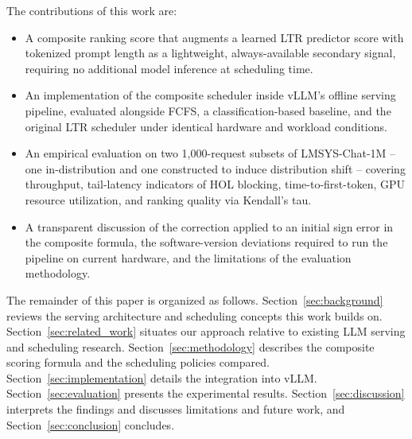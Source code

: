 The contributions of this work are:
\begin{itemize}
    \item A composite ranking score that augments a learned LTR predictor
    score with tokenized prompt length as a lightweight, always-available
    secondary signal, requiring no additional model inference at scheduling
    time.
    \item An implementation of the composite scheduler inside vLLM's offline
    serving pipeline, evaluated alongside FCFS, a classification-based
    baseline, and the original LTR scheduler under identical hardware and
    workload conditions.
    \item An empirical evaluation on two 1{,}000-request subsets of
    LMSYS-Chat-1M -- one in-distribution and one constructed to induce
    distribution shift -- covering throughput, tail-latency indicators of HOL
    blocking, time-to-first-token, GPU resource utilization, and ranking
    quality via Kendall's tau.
    \item A transparent discussion of the correction applied to an initial
    sign error in the composite formula, the software-version deviations
    required to run the pipeline on current hardware, and the limitations of
    the evaluation methodology.
\end{itemize}

The remainder of this paper is organized as follows. Section~\ref{sec:background}
reviews the serving architecture and scheduling concepts this work builds on.
Section~\ref{sec:related_work} situates our approach relative to existing LLM
serving and scheduling research. Section~\ref{sec:methodology} describes the
composite scoring formula and the scheduling policies compared.
Section~\ref{sec:implementation} details the integration into vLLM.
Section~\ref{sec:evaluation} presents the experimental results.
Section~\ref{sec:discussion} interprets the findings and discusses limitations
and future work, and Section~\ref{sec:conclusion} concludes.
